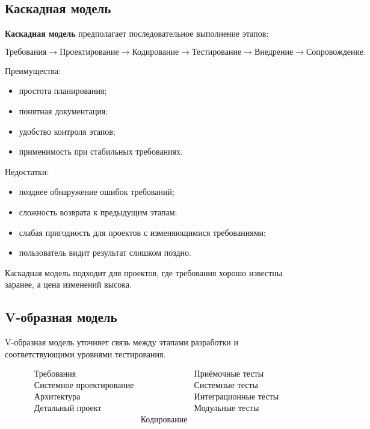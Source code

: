 \documentclass[12pt,a4paper]{article}
\begin{document}
\subsection{Каскадная модель}

\textbf{Каскадная модель} предполагает последовательное выполнение этапов:

\[
\text{Требования}
\rightarrow
\text{Проектирование}
\rightarrow
\text{Кодирование}
\rightarrow
\text{Тестирование}
\rightarrow
\text{Внедрение}
\rightarrow
\text{Сопровождение}.
\]

Преимущества:
\begin{itemize}
    \item простота планирования;
    \item понятная документация;
    \item удобство контроля этапов;
    \item применимость при стабильных требованиях.
\end{itemize}

Недостатки:
\begin{itemize}
    \item позднее обнаружение ошибок требований;
    \item сложность возврата к предыдущим этапам;
    \item слабая пригодность для проектов с изменяющимися требованиями;
    \item пользователь видит результат слишком поздно.
\end{itemize}

Каскадная модель подходит для проектов, где требования хорошо известны заранее, а цена изменений высока.

\subsection{V-образная модель}

V-образная модель уточняет связь между этапами разработки и соответствующими уровнями тестирования.

\[
\begin{array}{ccc}
\text{Требования} & & \text{Приёмочные тесты} \\
\text{Системное проектирование} & & \text{Системные тесты} \\
\text{Архитектура} & & \text{Интеграционные тесты} \\
\text{Детальный проект} & & \text{Модульные тесты} \\
& \text{Кодирование} &
\end{array}
\]
\end{document}
